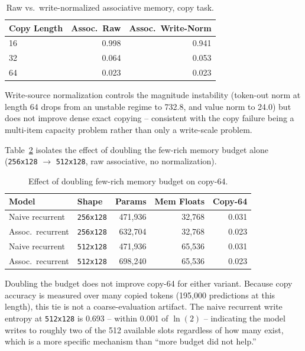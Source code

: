 \documentclass[10pt]{article} %
\begin{document}
\begin{table}[h]
\centering
\caption{Raw vs.\ write-normalized associative memory, copy task.}
\label{tab:assoc_copy_writenorm}
\begin{tabular}{lrr}
\toprule
Copy Length & Assoc.\ Raw & Assoc.\ Write-Norm \\
\midrule
16 & 0.998 & 0.941 \\
32 & 0.064 & 0.053 \\
64 & 0.023 & 0.023 \\
\bottomrule
\end{tabular}
\end{table}

Write-source normalization controls the magnitude instability (token-out
norm at length 64 drops from an unstable regime to 732.8, and value norm to
24.0) but does not improve dense exact copying -- consistent with the copy
failure being a multi-item capacity problem rather than only a write-scale
problem.

Table~\ref{tab:assoc_copy2x} isolates the effect of doubling the few-rich
memory budget alone (\texttt{256x128} $\to$ \texttt{512x128}, raw
associative, no normalization).

\begin{table}[h]
\centering
\caption{Effect of doubling few-rich memory budget on copy-64.}
\label{tab:assoc_copy2x}
\begin{tabular}{llrrr}
\toprule
Model & Shape & Params & Mem Floats & Copy-64 \\
\midrule
Naive recurrent & \texttt{256x128} & 471{,}936 & 32{,}768 & 0.031 \\
Assoc.\ recurrent & \texttt{256x128} & 632{,}704 & 32{,}768 & 0.023 \\
Naive recurrent & \texttt{512x128} & 471{,}936 & 65{,}536 & 0.031 \\
Assoc.\ recurrent & \texttt{512x128} & 698{,}240 & 65{,}536 & 0.023 \\
\bottomrule
\end{tabular}
\end{table}

Doubling the budget does not improve copy-64 for either variant. Because
copy accuracy is measured over many copied tokens (195{,}000 predictions at
this length), this tie is not a coarse-evaluation artifact. The naive
recurrent write entropy at \texttt{512x128} is 0.693 -- within 0.001 of
$\ln(2)$ -- indicating the model writes to roughly two of the 512 available
slots regardless of how many exist, which is a more specific mechanism than
``more budget did not help.''
\end{document}
